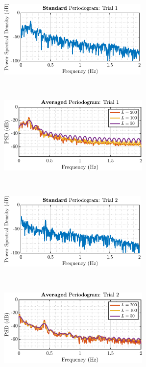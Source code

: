 \begin{enumerate}[label=\alph*), leftmargin=*]
\begin{figure}[h]
    \centering
    \begin{subfigure}{0.49\textwidth}
        \centering
        \includegraphics[height=1.5in]{report/parametric-and-line-spectra/real-world-signals_respiratory-sinus-arrhythmia-from-RR-Intervals/assets/a/standard-trial1}
    \end{subfigure}
    ~
    \begin{subfigure}{0.49\textwidth}
        \centering
        \includegraphics[height=1.5in]{report/parametric-and-line-spectra/real-world-signals_respiratory-sinus-arrhythmia-from-RR-Intervals/assets/a/averaged-trial1}
    \end{subfigure}
    ~
    ~
    \begin{subfigure}{0.49\textwidth}
        \centering
        \includegraphics[height=1.5in]{report/parametric-and-line-spectra/real-world-signals_respiratory-sinus-arrhythmia-from-RR-Intervals/assets/a/standard-trial2}
    \end{subfigure}
    ~ 
    \begin{subfigure}{0.49\textwidth}
        \centering
        \includegraphics[height=1.5in]{report/parametric-and-line-spectra/real-world-signals_respiratory-sinus-arrhythmia-from-RR-Intervals/assets/a/averaged-trial2}

\end{subfigure}
\end{figure}
\end{enumerate}
